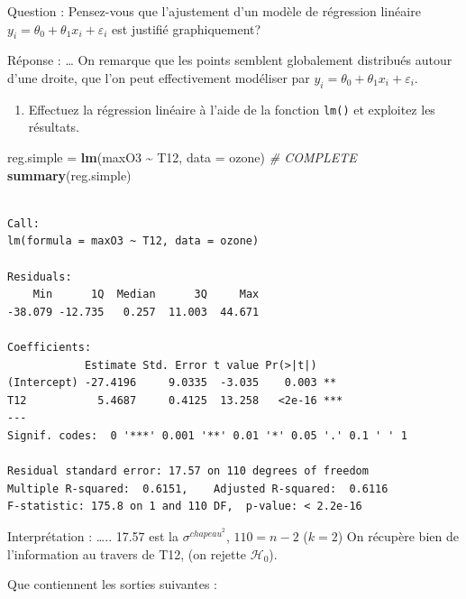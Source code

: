 \documentclass[
]{article}
\newenvironment{Shaded}{\begin{snugshade}}{\end{snugshade}}
\newcommand{\AttributeTok}[1]{\textcolor[rgb]{0.13,0.29,0.53}{#1}}
\newcommand{\CommentTok}[1]{\textcolor[rgb]{0.56,0.35,0.01}{\textit{#1}}}
\newcommand{\FunctionTok}[1]{\textcolor[rgb]{0.13,0.29,0.53}{\textbf{#1}}}
\newcommand{\NormalTok}[1]{#1}
\newcommand{\OtherTok}[1]{\textcolor[rgb]{0.56,0.35,0.01}{#1}}
\newcommand{\SpecialCharTok}[1]{\textcolor[rgb]{0.81,0.36,0.00}{\textbf{#1}}}
\providecommand{\tightlist}{%
  \setlength{\itemsep}{0pt}\setlength{\parskip}{0pt}}
\begin{document}
Question : Pensez-vous que l'ajustement d'un modèle de régression
linéaire \(y_i = \theta_0+\theta_1 x_i +\varepsilon_i\) est justifié
graphiquement?

Réponse : \ldots{} On remarque que les points semblent globalement
distribués autour d'une droite, que l'on peut effectivement modéliser
par \(y_i = \theta_0+\theta_1 x_i +\varepsilon_i\).

\begin{enumerate}
\def\labelenumi{\arabic{enumi}.}
\setcounter{enumi}{1}
\tightlist
\item
  Effectuez la régression linéaire à l'aide de la fonction \texttt{lm()}
  et exploitez les résultats.
\end{enumerate}

\begin{Shaded}
\begin{Highlighting}[]
\NormalTok{reg.simple }\OtherTok{=} \FunctionTok{lm}\NormalTok{(maxO3 }\SpecialCharTok{\textasciitilde{}}\NormalTok{ T12, }\AttributeTok{data =}\NormalTok{ ozone)  }\CommentTok{\# COMPLETE}
\FunctionTok{summary}\NormalTok{(reg.simple)}
\end{Highlighting}
\end{Shaded}

\begin{verbatim}

Call:
lm(formula = maxO3 ~ T12, data = ozone)

Residuals:
    Min      1Q  Median      3Q     Max 
-38.079 -12.735   0.257  11.003  44.671 

Coefficients:
            Estimate Std. Error t value Pr(>|t|)    
(Intercept) -27.4196     9.0335  -3.035    0.003 ** 
T12           5.4687     0.4125  13.258   <2e-16 ***
---
Signif. codes:  0 '***' 0.001 '**' 0.01 '*' 0.05 '.' 0.1 ' ' 1

Residual standard error: 17.57 on 110 degrees of freedom
Multiple R-squared:  0.6151,    Adjusted R-squared:  0.6116 
F-statistic: 175.8 on 1 and 110 DF,  p-value: < 2.2e-16
\end{verbatim}

Interprétation : \ldots.. 17.57 est la \(\sigma^{chapeau}^2\),
\(110 = n - 2\) (\(k = 2\)) On récupère bien de l'information au travers
de T12, (on rejette \(\mathcal{H_0}\)).

Que contiennent les sorties suivantes :

\begin{Shaded}
\end{Shaded}
\end{document}
